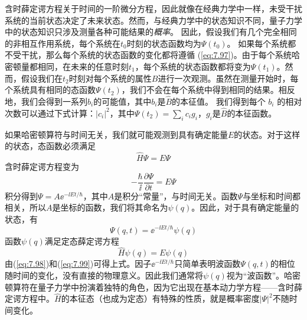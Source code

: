     \begin{center}
    \end{center}

    含时薛定谔方程关于时间的一阶微分方程，因此就像在经典力学中一样，未受干扰系统的当前状态决定了未来状态。然而，与经典力学中的状态知识不同，量子力学中的状态知识只涉及测量各种可能结果的\textit{概率}。 因此，假设我们有几个完全相同的非相互作用系统，每个系统在$t_0$时刻的状态函数均为$\Psi\left(t_0\right)$。 如果每个系统都不受干扰，那么每个系统的状态函数的变化都将遵循 (\ref{eq:7.97})。由于每个系统哈密顿量都相同，在未来的任意时刻$t_1$，每个系统的状态函数都将变为$\Psi\left(t_1\right)$。然而，假设我们在$t_2$时刻对每个系统的属性$B$进行一次观测。虽然在测量开始时，每个系统具有相同的态函数$\Psi\left(t_2\right)$，我们不会在每个系统中得到相同的结果。相反地，我们会得到一系列$b_i$的可能值，其中$b_i$是$\hat{B}$的本征值。 我们得到每个 $b_i$ 的相对次数可以通过下式计算：$\left|c_i\right|^2$，其中$\Psi\left(t_2\right) = \sum_{i}c_ig_i$，$g_i$是$\hat{B}$的本征函数。

    如果哈密顿算符与时间无关，我们就可能观测到具有确定能量$E$的状态。对于这样的状态，态函数必须满足
    \begin{equation}
        \hat{H}\Psi = E\Psi
        \label{eq:7.98}
    \end{equation}
    含时薛定谔方程变为
    \begin{equation*}
            -\frac{\hbar}{\ii }\frac{\partial\Psi}{\partial t} = E\Psi
    \end{equation*}
    积分得到$\Psi = A\ee ^{-\ii Et/\hbar}$，其中$A$是积分“常量”，与时间无关。函数$\Psi$与坐标和时间都相关，所以$A$是坐标的函数，我们将其命名为$\psi\left(q\right)$。因此，对于具有确定能量的状态，有
    \begin{equation}
        \Psi\left(q,t\right) = \ee ^{-\ii Et/\hbar}\psi\left(q\right)
        \label{eq:7.99}
    \end{equation}
    函数$\psi\left(q\right)$满足定态薛定谔方程
    \begin{equation*}
        \hat{H}\psi\left(q\right) = E\psi\left(q\right)
    \end{equation*}
    由(\ref{eq:7.98})和(\ref{eq:7.99})可得上式。因子$\ee ^{-\ii Et/\hbar}$只简单表明波函数$\Psi\left(q,t\right)$的相位随时间的变化，没有直接的物理意义。因此我们通常将$\psi\left(q\right)$视为“波函数”。哈密顿算符在量子力学中扮演着独特的角色，因为它出现在基本动力学方程——含时薛定谔方程中。$\hat{H}$的本征态（也成为定态）有特殊的性质，就是概率密度$\left|\Psi\right|^2$不随时间变化。

